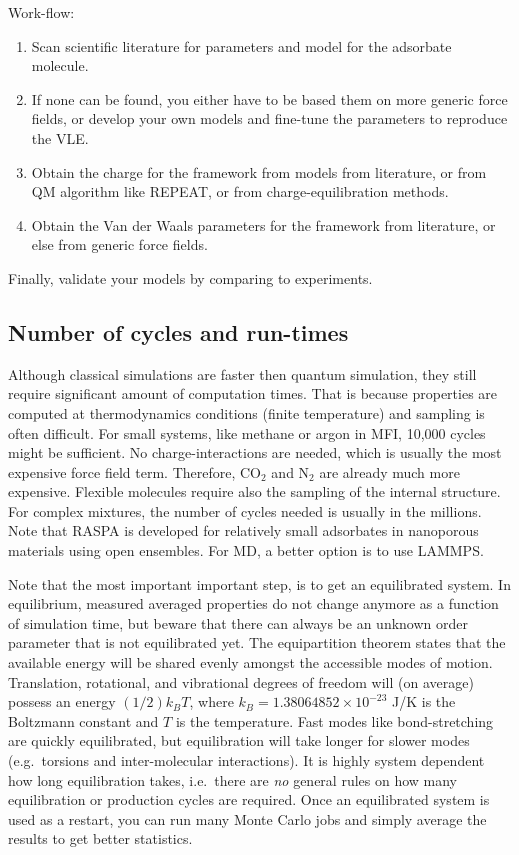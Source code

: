 Work-flow:
\begin{enumerate}
\item{Scan scientific literature for parameters and model for the adsorbate molecule.}
\item{If none can be found, you either have to be based them on more generic force fields, or develop your own models and fine-tune
    the parameters to reproduce the VLE.}
\item{Obtain the charge for the framework from models from literature, or from QM algorithm like REPEAT, or from charge-equilibration methods.}
\item{Obtain the Van der Waals parameters for the framework from literature, or else from generic force fields.}
\end{enumerate}
Finally, validate your models by comparing to experiments.

\subsection*{Number of cycles and run-times}

Although classical simulations are faster then quantum simulation, they still require significant amount of computation times.
That is because properties are computed at thermodynamics conditions (finite temperature) and sampling is often difficult.
For small systems, like methane or argon in MFI,  10,000 cycles might be sufficient. No charge-interactions are needed, which is
usually the most expensive force field term. Therefore, CO$_2$ and N$_2$ are already much more expensive.
Flexible molecules require also the sampling of the internal structure. For complex mixtures, the number of cycles needed is
usually in the millions.
Note that RASPA is developed for relatively small adsorbates in nanoporous materials using open ensembles. 
For MD, a better option is to use LAMMPS\cite{Plimpton1995}.

Note that the most important important step, is to get an equilibrated system.
In equilibrium, measured averaged properties do not change
anymore as a function of simulation time,
but beware that there can always be an unknown order parameter that is not equilibrated yet.
The equipartition theorem states that the available energy will be shared evenly amongst the accessible modes of motion.
Translation, rotational, and vibrational degrees of freedom will (on average) possess an energy $(1/2) k_B T$,
where $k_B=1.38064852\times10^{-23}$ J/K is the Boltzmann constant and $T$ is the temperature.
Fast modes like bond-stretching are quickly equilibrated, but equilibration will take longer for slower modes (e.g.\ torsions and inter-molecular interactions).
It is highly system dependent how long equilibration takes, i.e.\
there are \emph{no} general rules on how many equilibration or production cycles are required.
Once an equilibrated system is used as a restart, you can run many Monte Carlo jobs and simply average the results to get better statistics.



